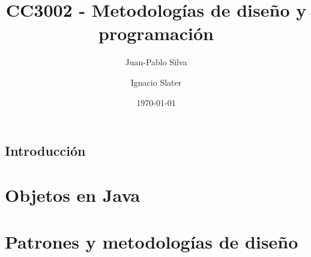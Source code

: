 \documentclass{book}
\title{CC3002 - Metodologías de diseño y programación}
\author{Juan-Pablo Silva}
\author{Ignacio Slater}
\affil{Departamento de Ciencias de la Computación, Universidad de Chile}
\date{\today}
\begin{document}
  \frontmatter
  \maketitle
  \tableofcontents
  \chapter{Introducción}

  \mainmatter
  \part{Objetos en Java}
  \part{Patrones y metodologías de diseño}
\end{document}
